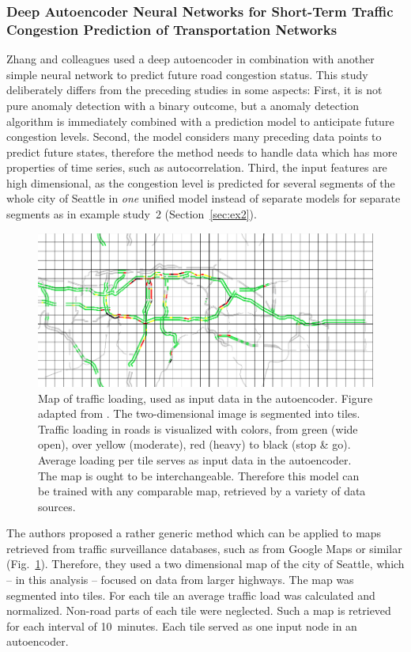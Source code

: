 \documentclass[conference]{IEEEtran}
\begin{document}
\subsubsection{Deep Autoencoder Neural Networks for Short-Term Traffic Congestion Prediction of Transportation Networks \cite{zhang2019deep}}
\label{sec:ex3}

Zhang and colleagues \cite{zhang2019deep} used a deep autoencoder in combination with another simple neural network to predict future road congestion status. This study deliberately differs from the preceding studies in some aspects: First, it is not pure anomaly detection with a binary outcome, but a anomaly detection algorithm is immediately combined with a prediction model to anticipate future congestion levels. Second, the model considers many preceding data points to predict future states, therefore the method needs to handle data which has more properties of time series, such as autocorrelation. Third, the input features are high dimensional, as the congestion level is predicted for several segments of the whole city of Seattle in \textit{one} unified model instead of separate models for separate segments as in example study~2 (Section~\ref{sec:ex2}).

\begin{figure}[t]
\centering
\includegraphics[width=.45\textwidth, trim=0 0 0 0, clip]{images/roads.png} 
\caption{Map of traffic loading, used as input data in the autoencoder. Figure adapted from \cite{zhang2019deep}. The two-dimensional image is segmented into tiles. Traffic loading in roads is visualized with colors, from green (wide open), over yellow (moderate), red (heavy) to black (stop \& go). Average loading per tile serves as input data in the autoencoder. The map is ought to be interchangeable. Therefore this model can be trained with any comparable map, retrieved by a variety of data sources.}
\label{fig:roads}
\end{figure}


The authors proposed a rather generic method which can be applied to maps retrieved from traffic surveillance databases, such as from Google Maps or similar (Fig.~\ref{fig:roads}). Therefore, they used a two dimensional map of the city of Seattle, which -- in this analysis -- focused on data from larger highways. The map was segmented into tiles. For each tile an average traffic load was calculated and normalized. Non-road parts of each tile were neglected. Such a map is retrieved for each interval of 10~minutes. Each tile served as one input node in an autoencoder.
\end{document}
